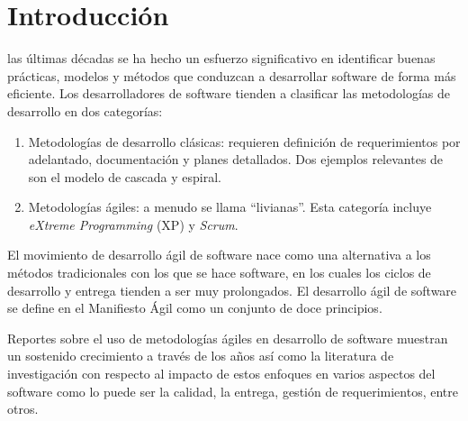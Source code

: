 \documentclass[journal]{IEEEtran}
\begin{document}
%
\IEEEpeerreviewmaketitle



\section{Introducción}
% 
% 
% 
% 
 las últimas décadas se ha hecho un esfuerzo significativo en identificar buenas prácticas, modelos y métodos que conduzcan a desarrollar software de forma más eficiente. Los desarrolladores de software tienden a clasificar las metodologías de desarrollo en dos categorías\cite{li-jian-armin-eberlein}:
\begin{enumerate}
    \item Metodologías de desarrollo clásicas: requieren definición de requerimientos por adelantado, documentación y planes detallados. Dos ejemplos relevantes de son el modelo de cascada y espiral.
    \item Metodologías ágiles: a menudo se llama ``livianas''. Esta categoría incluye \emph{eXtreme Programming} (XP) y \emph{Scrum}.
\end{enumerate}

El movimiento de desarrollo ágil de software nace como una alternativa a los métodos tradicionales con los que se hace software, en los cuales los ciclos de desarrollo y entrega tienden a ser muy  prolongados. El desarrollo ágil de software se define en el Manifiesto Ágil \cite{agile-manifesto} como un conjunto de doce principios. 

Reportes sobre el uso de metodologías ágiles en desarrollo de software muestran un sostenido crecimiento a través de los años\cite{version-one} así como la literatura de investigación con respecto al impacto de estos enfoques en varios aspectos del software como lo puede ser la calidad, la entrega, gestión de requerimientos, entre otros. 
\end{document}
